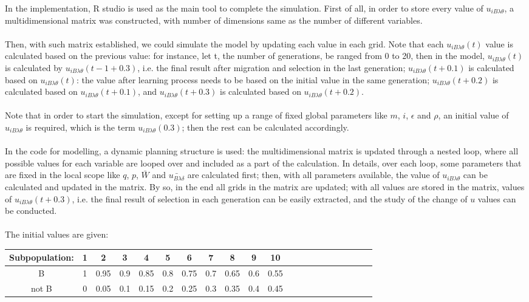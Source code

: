 \documentclass[a4paper,8pt]{extarticle}
\begin{document}
In the implementation, R studio is used as the main tool to complete the simulation. First of all, in order to store every value of $u_{iB\lambda\theta}$, a multidimensional matrix was constructed, with number of dimensions same as the number of different variables.
\\
\\
Then, with such matrix established, we could simulate the model by updating each value in each grid. Note that each $u_{iB\lambda\theta}(t)$ value is calculated based on the previous value: for instance, let t, the number of generations, be ranged from 0 to 20, then in the model, $u_{iB\lambda\theta}(t)$ is calculated by $u_{iB\lambda\theta}(t - 1 + 0.3)$, i.e. the final result after migration and selection in the last generation; $u_{iB\lambda\theta}(t + 0.1)$ is calculated based on $u_{iB\lambda\theta}(t)$: the value after learning process needs to be based on the initial value in the same generation; $u_{iB\lambda\theta}(t + 0.2)$ is calculated based on $u_{iB\lambda\theta}(t + 0.1)$, and $u_{iB\lambda\theta}(t + 0.3)$ is calculated based on $u_{iB\lambda\theta}(t + 0.2)$. 
\\
\\
Note that in order to start the simulation, except for setting up a range of fixed global parameters like $m$, $i$, $\epsilon$ and $\rho$, an initial value of $u_{iB\lambda\theta}$ is required, which is the term $u_{iB\lambda\theta}(0.3)$; then the rest can be calculated accordingly.
\\
\\
In the code for modelling, a dynamic planning structure is used: the multidimensional matrix is updated through a nested loop, where all possible values for each variable are looped over and included as a part of the calculation. In details, over each loop, some parameters that are fixed in the local scope like $q$, $p$, $\bar{W}$ and $\bar{u_{B\lambda\delta}}$ are calculated first; then, with all parameters available, the value of $u_{iB\lambda\theta}$ can be calculated and updated in the matrix. By so, in the end all grids in the matrix are updated; with all values are stored in the matrix, values of $u_{iB\lambda\theta}(t + 0.3)$, i.e. the final result of selection in each generation can be easily extracted, and the study of the change of $u$ values can be conducted.
\\
\\
The initial values are given:
\begin{center}
\begin{tabular}{||c|c|c|c|c|c|c|c|c|c|c|c|c|c|c|c|c|c|c|c|c||} 
 \hline
  Subpopulation: &1&2&3&4&5&6&7&8&9&10 \\ [0.5ex] 
 \hline\hline
 B & 1&0.95&0.9&0.85&0.8&0.75&0.7&0.65&0.6&0.55\\ 
 \hline
 not B &0&0.05&0.1&0.15&0.2&0.25&0.3&0.35&0.4&0.45\\
 \hline
\end{tabular}
\end{center}
\end{document}
